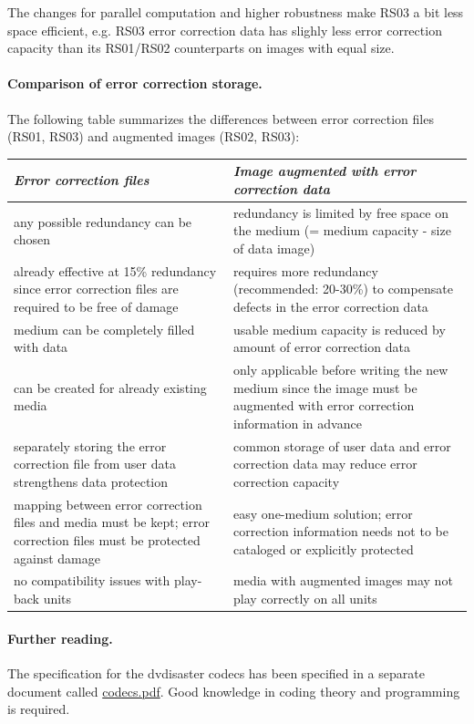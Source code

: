 The changes for parallel computation and higher robustness make RS03 a bit less space efficient, 
e.g. RS03 error correction data has slighly less error correction capacity than 
its RS01/RS02 counterparts on images with equal size.

\newpage

\paragraph{Comparison of error correction storage.} The following table summarizes the differences 
between error correction files (RS01, RS03) and augmented images (RS02, RS03):

\smallskip

\begin{tabular}{|p{}|p{}|}
\hline
{\em Error correction files} 	& 
{\em Image augmented with error correction data} \\
\hline
any possible redundancy can be chosen &	
redundancy is limited by free space on the medium (= medium capacity - size of data image) \\
\hline
already effective at 15\% redundancy since error correction files are required to be free of damage &
requires more redundancy (recommended: 20-30\%) to compensate defects in the error correction data \\
\hline
medium can be completely filled with data  &
usable medium capacity is reduced by amount of error correction data \\
\hline
can be created for already existing media & 
only applicable before writing the new medium since the image must be augmented with error correction information in advance \\
\hline
separately storing the error correction file from user data strengthens data protection &
common storage of user data and error correction data may reduce error correction capacity \\
\hline
mapping between error correction files and media must be kept; error correction files must be 
protected against damage &
easy one-medium solution; error correction information needs not to be cataloged or explicitly protected \\
\hline
no compatibility issues with play-back units &
media with augmented images may not play correctly on all units \\
\hline
\end{tabular}

\paragraph{Further reading.} The specification for the dvdisaster codecs 
has been specified in a separate document called \href{http://dvdisaster.net/downloads/codecs.pdf}{codecs.pdf}. 
Good knowledge in coding theory and programming is required.

